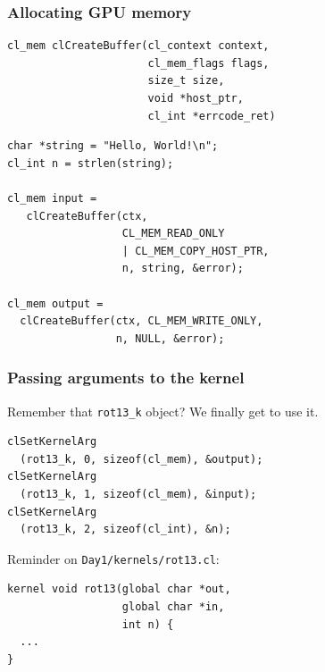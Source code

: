 \documentclass{beamer}
\begin{document}
\begin{frame}
  \frametitle{Allocating GPU memory}

\begin{lstlisting}[backgroundcolor=\color{lightgray}]
cl_mem clCreateBuffer(cl_context context,
                      cl_mem_flags flags,
                      size_t size,
                      void *host_ptr,
                      cl_int *errcode_ret)
\end{lstlisting}

\begin{lstlisting}
char *string = "Hello, World!\n";
cl_int n = strlen(string);

cl_mem input =
   clCreateBuffer(ctx,
                  CL_MEM_READ_ONLY
                  | CL_MEM_COPY_HOST_PTR,
                  n, string, &error);

cl_mem output =
  clCreateBuffer(ctx, CL_MEM_WRITE_ONLY,
                 n, NULL, &error);
\end{lstlisting}

\end{frame}

\begin{frame}
  \frametitle{Passing arguments to the kernel}

  Remember that \texttt{rot13\_k} object?  We finally get to use it.

\begin{lstlisting}
clSetKernelArg
  (rot13_k, 0, sizeof(cl_mem), &output);
clSetKernelArg
  (rot13_k, 1, sizeof(cl_mem), &input);
clSetKernelArg
  (rot13_k, 2, sizeof(cl_int), &n);
\end{lstlisting}

Reminder on \texttt{Day1/kernels/rot13.cl}:

\begin{lstlisting}
kernel void rot13(global char *out,
                  global char *in,
                  int n) {
  ...
}
\end{lstlisting}

\end{frame}
\end{document}
